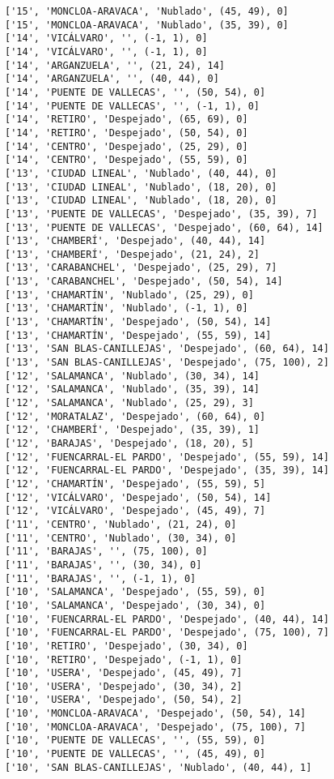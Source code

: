 \documentclass[11pt]{article}
\begin{document}
\begin{Verbatim}[commandchars=\\\{\}]
['15', 'MONCLOA-ARAVACA', 'Nublado', (45, 49), 0]
['15', 'MONCLOA-ARAVACA', 'Nublado', (35, 39), 0]
['14', 'VICÁLVARO', '', (-1, 1), 0]
['14', 'VICÁLVARO', '', (-1, 1), 0]
['14', 'ARGANZUELA', '', (21, 24), 14]
['14', 'ARGANZUELA', '', (40, 44), 0]
['14', 'PUENTE DE VALLECAS', '', (50, 54), 0]
['14', 'PUENTE DE VALLECAS', '', (-1, 1), 0]
['14', 'RETIRO', 'Despejado', (65, 69), 0]
['14', 'RETIRO', 'Despejado', (50, 54), 0]
['14', 'CENTRO', 'Despejado', (25, 29), 0]
['14', 'CENTRO', 'Despejado', (55, 59), 0]
['13', 'CIUDAD LINEAL', 'Nublado', (40, 44), 0]
['13', 'CIUDAD LINEAL', 'Nublado', (18, 20), 0]
['13', 'CIUDAD LINEAL', 'Nublado', (18, 20), 0]
['13', 'PUENTE DE VALLECAS', 'Despejado', (35, 39), 7]
['13', 'PUENTE DE VALLECAS', 'Despejado', (60, 64), 14]
['13', 'CHAMBERÍ', 'Despejado', (40, 44), 14]
['13', 'CHAMBERÍ', 'Despejado', (21, 24), 2]
['13', 'CARABANCHEL', 'Despejado', (25, 29), 7]
['13', 'CARABANCHEL', 'Despejado', (50, 54), 14]
['13', 'CHAMARTÍN', 'Nublado', (25, 29), 0]
['13', 'CHAMARTÍN', 'Nublado', (-1, 1), 0]
['13', 'CHAMARTÍN', 'Despejado', (50, 54), 14]
['13', 'CHAMARTÍN', 'Despejado', (55, 59), 14]
['13', 'SAN BLAS-CANILLEJAS', 'Despejado', (60, 64), 14]
['13', 'SAN BLAS-CANILLEJAS', 'Despejado', (75, 100), 2]
['12', 'SALAMANCA', 'Nublado', (30, 34), 14]
['12', 'SALAMANCA', 'Nublado', (35, 39), 14]
['12', 'SALAMANCA', 'Nublado', (25, 29), 3]
['12', 'MORATALAZ', 'Despejado', (60, 64), 0]
['12', 'CHAMBERÍ', 'Despejado', (35, 39), 1]
['12', 'BARAJAS', 'Despejado', (18, 20), 5]
['12', 'FUENCARRAL-EL PARDO', 'Despejado', (55, 59), 14]
['12', 'FUENCARRAL-EL PARDO', 'Despejado', (35, 39), 14]
['12', 'CHAMARTÍN', 'Despejado', (55, 59), 5]
['12', 'VICÁLVARO', 'Despejado', (50, 54), 14]
['12', 'VICÁLVARO', 'Despejado', (45, 49), 7]
['11', 'CENTRO', 'Nublado', (21, 24), 0]
['11', 'CENTRO', 'Nublado', (30, 34), 0]
['11', 'BARAJAS', '', (75, 100), 0]
['11', 'BARAJAS', '', (30, 34), 0]
['11', 'BARAJAS', '', (-1, 1), 0]
['10', 'SALAMANCA', 'Despejado', (55, 59), 0]
['10', 'SALAMANCA', 'Despejado', (30, 34), 0]
['10', 'FUENCARRAL-EL PARDO', 'Despejado', (40, 44), 14]
['10', 'FUENCARRAL-EL PARDO', 'Despejado', (75, 100), 7]
['10', 'RETIRO', 'Despejado', (30, 34), 0]
['10', 'RETIRO', 'Despejado', (-1, 1), 0]
['10', 'USERA', 'Despejado', (45, 49), 7]
['10', 'USERA', 'Despejado', (30, 34), 2]
['10', 'USERA', 'Despejado', (50, 54), 2]
['10', 'MONCLOA-ARAVACA', 'Despejado', (50, 54), 14]
['10', 'MONCLOA-ARAVACA', 'Despejado', (75, 100), 7]
['10', 'PUENTE DE VALLECAS', '', (55, 59), 0]
['10', 'PUENTE DE VALLECAS', '', (45, 49), 0]
['10', 'SAN BLAS-CANILLEJAS', 'Nublado', (40, 44), 1]

\end{Verbatim}
\end{document}

